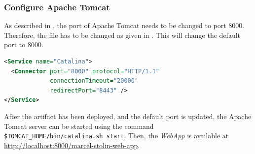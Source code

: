 \subsubsection{Configure Apache Tomcat}
As described in , the port of Apache Tomcat needs to be changed to port 8000. Therefore, the file  has to be changed as given in . This will change the default port to 8000.
\begin{lstlisting}[label=lst:04_comments_webapp_artifact_config, caption=Apache Tomcat configuration, language=xml]
<Service name="Catalina">
  <Connector port="8000" protocol="HTTP/1.1"
             connectionTimeout="20000"
             redirectPort="8443" />
</Service>
\end{lstlisting}

After the artifact has been deployed, and the default port is updated, the Apache Tomcat server can be started using the command \texttt{\$TOMCAT\_HOME/bin/catalina.sh start}. Then, the \textit{WebApp} is available at \url{http://localhost:8000/marcel-stolin-web-app}.
